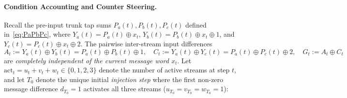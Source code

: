 \documentclass[11pt,a4paper]{article}
\theoremstyle{definition}
\theoremstyle{remark}
\begin{document}
\paragraph{Condition Accounting and Counter Steering.}
Recall the pre-input trunk tap sums $P_a(t), P_b(t), P_c(t)$ defined in~\eqref{eq:PaPbPc}, where $Y_a(t) = P_a(t) \oplus x_t$, $Y_b(t) = P_b(t) \oplus x_t \oplus 1$, and $Y_c(t) = P_c(t) \oplus x_t \oplus 2$. The pairwise inter-stream input differences
\begin{equation}
\label{eq:AtCtGt}
A_t := Y_a(t) \oplus Y_b(t) = P_a(t) \oplus P_b(t) \oplus 1, \quad
C_t := Y_a(t) \oplus Y_c(t) = P_a(t) \oplus P_c(t) \oplus 2, \quad
G_t := A_t \oplus C_t
\end{equation}
are \emph{completely independent of the current message word $x_t$}. Let $\mathrm{act}_t = u_t + v_t + w_t \in \{0, 1, 2, 3\}$ denote the number of active streams at step $t$, and let $T_0$ denote the unique initial \emph{injection step} where the first non-zero message difference $d_{T_0} = 1$ activates all three streams ($u_{T_0} = v_{T_0} = w_{T_0} = 1$):
\end{document}
